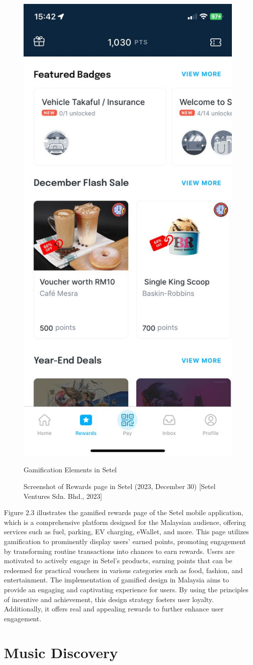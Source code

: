 \begin{figure}[h]
    \centering
    \includegraphics[width=0.35\linewidth]{mainmatter/images/gami1.jpg}
    \caption{Gamification Elements in Setel}
    \caption*{Screenshot of Rewards page in Setel (2023, December 30) [Setel Ventures Sdn. Bhd., 2023]}
    \label{fig:myfig3}
\end{figure}
Figure 2.3 illustrates the gamified rewards page of the Setel mobile application, which is a comprehensive platform designed for the Malaysian audience, offering services such as fuel, parking, EV charging, eWallet, and more. This page utilizes gamification to prominently display users' earned points, promoting engagement by transforming routine transactions into chances to earn rewards. Users are motivated to actively engage in Setel's products, earning points that can be redeemed for practical vouchers in various categories such as food, fashion, and entertainment. The implementation of gamified design in Malaysia aims to provide an engaging and captivating experience for users. By using the principles of incentive and achievement, this design strategy fosters user loyalty. Additionally, it offers real and appealing rewards to further enhance user engagement.

\section{Music Discovery}

